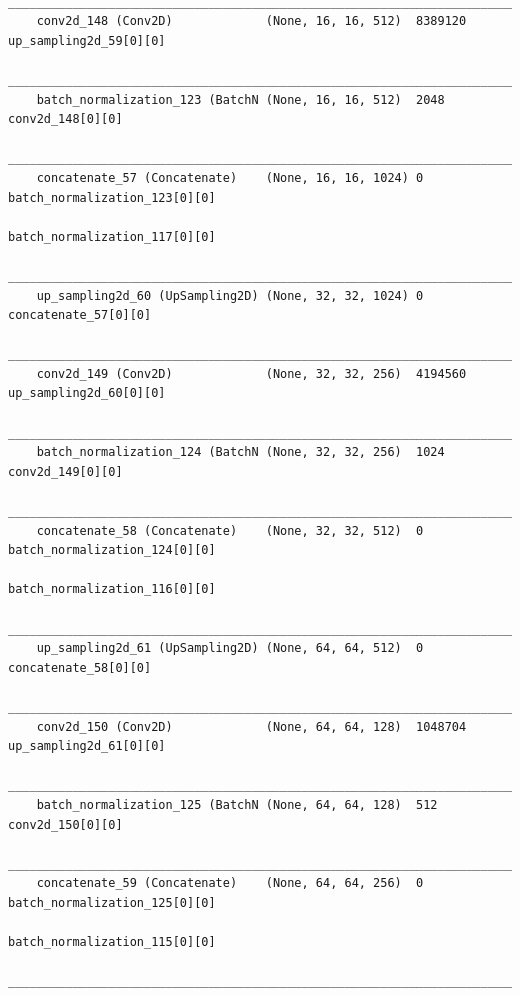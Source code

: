 {\begin{verbatim}
    __________________________________________________________________________________________________
    conv2d_148 (Conv2D)             (None, 16, 16, 512)  8389120     up_sampling2d_59[0][0]           
    __________________________________________________________________________________________________
    batch_normalization_123 (BatchN (None, 16, 16, 512)  2048        conv2d_148[0][0]                 
    __________________________________________________________________________________________________
    concatenate_57 (Concatenate)    (None, 16, 16, 1024) 0           batch_normalization_123[0][0]    
                                                                        batch_normalization_117[0][0]    
    __________________________________________________________________________________________________
    up_sampling2d_60 (UpSampling2D) (None, 32, 32, 1024) 0           concatenate_57[0][0]             
    __________________________________________________________________________________________________
    conv2d_149 (Conv2D)             (None, 32, 32, 256)  4194560     up_sampling2d_60[0][0]           
    __________________________________________________________________________________________________
    batch_normalization_124 (BatchN (None, 32, 32, 256)  1024        conv2d_149[0][0]                 
    __________________________________________________________________________________________________
    concatenate_58 (Concatenate)    (None, 32, 32, 512)  0           batch_normalization_124[0][0]    
                                                                        batch_normalization_116[0][0]    
    __________________________________________________________________________________________________
    up_sampling2d_61 (UpSampling2D) (None, 64, 64, 512)  0           concatenate_58[0][0]             
    __________________________________________________________________________________________________
    conv2d_150 (Conv2D)             (None, 64, 64, 128)  1048704     up_sampling2d_61[0][0]           
    __________________________________________________________________________________________________
    batch_normalization_125 (BatchN (None, 64, 64, 128)  512         conv2d_150[0][0]                 
    __________________________________________________________________________________________________
    concatenate_59 (Concatenate)    (None, 64, 64, 256)  0           batch_normalization_125[0][0]    
                                                                        batch_normalization_115[0][0]    
    __________________________________________________________________________________________________

\end{verbatim}}
